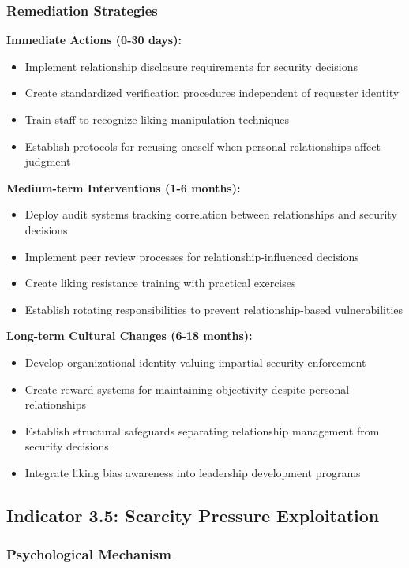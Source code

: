 \documentclass[11pt,a4paper]{article}
\begin{document}
\subsubsection{Remediation Strategies}

\textbf{Immediate Actions (0-30 days):}
\begin{itemize}
\item Implement relationship disclosure requirements for security decisions
\item Create standardized verification procedures independent of requester identity
\item Train staff to recognize liking manipulation techniques
\item Establish protocols for recusing oneself when personal relationships affect judgment
\end{itemize}

\textbf{Medium-term Interventions (1-6 months):}
\begin{itemize}
\item Deploy audit systems tracking correlation between relationships and security decisions
\item Implement peer review processes for relationship-influenced decisions
\item Create liking resistance training with practical exercises
\item Establish rotating responsibilities to prevent relationship-based vulnerabilities
\end{itemize}

\textbf{Long-term Cultural Changes (6-18 months):}
\begin{itemize}
\item Develop organizational identity valuing impartial security enforcement
\item Create reward systems for maintaining objectivity despite personal relationships
\item Establish structural safeguards separating relationship management from security decisions
\item Integrate liking bias awareness into leadership development programs
\end{itemize}

\subsection{Indicator 3.5: Scarcity Pressure Exploitation}

\subsubsection{Psychological Mechanism}
\end{document}
